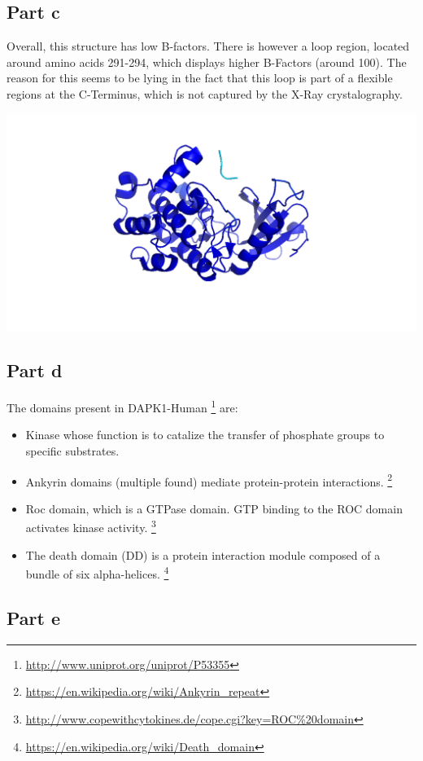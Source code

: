 \documentclass[11pt, a4paper,titlepage]{article}
\begin{document}
\subsection{Part c}

Overall, this structure has low B-factors. There is however a loop
region, located around amino acids 291-294, which displays higher
B-Factors (around 100). The reason for this seems to be lying in the
fact that this loop is part of a flexible regions at the C-Terminus,
which is not captured by the X-Ray crystalography.

\includegraphics[width=15cm]{./Figures/5c.png}

\subsection{Part d}
The domains present in DAPK1-Human
\footnote{\url{http://www.uniprot.org/uniprot/P53355}} are:

\begin{itemize}
\item Kinase whose function is to catalize the transfer of phosphate
  groups to specific substrates.
\item Ankyrin domains (multiple found) mediate protein-protein
  interactions.
  \footnote{\url{https://en.wikipedia.org/wiki/Ankyrin_repeat}}
\item Roc domain, which is a GTPase domain. GTP binding to the ROC
  domain activates kinase activity.
  \footnote{\url{http://www.copewithcytokines.de/cope.cgi?key=ROC\%20domain}} 
\item The death domain (DD) is a protein interaction module composed
  of a bundle of six alpha-helices.
  \footnote{\url{https://en.wikipedia.org/wiki/Death_domain}}
\end{itemize}
\subsection{Part e}
\end{document}
